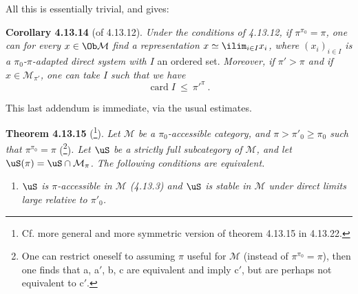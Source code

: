 All this is essentially trivial, and gives:

\noindent\textbf{Corollary 4.13.14} (of 4.13.12). \textit{Under the conditions of 4.13.12, if $\pi^{\pi_0} = \pi$, one can for every $x \in \Ob\mathcal{M}$ find a representation $x \simeq \ilim_{i\in I} x_i$, where $(x_i)_{i\in I}$ is a $\pi_0$-$\pi$-adapted direct system with $I$} an ordered set. \textit{Moreover, if $\pi' > \pi$ and if $x \in \mathcal{M}_{\pi'}$, one can take $I$ such that we have}
\[
\operatorname{card} I \ \leqslant \ {\pi'}^{\pi} \ .
\]

This last addendum is immediate, via the usual estimates.

\noindent\textbf{Theorem 4.13.15} (\footnote[134]{Cf. more general and more symmetric version of theorem 4.13.15 in 4.13.22.}). \textit{Let $\mathcal{M}$ be a $\pi_0$-accessible category, and $\pi > \pi'_0 \geqslant \pi_0$ such that $\pi^{\pi_0} = \pi$} (\footnote[135]{One can restrict oneself to assuming $\pi$ useful for $\mathcal{M}$ (instead of $\pi^{\pi_0} = \pi$), then one finds that a, a$'$, b, c are equivalent and imply c$'$, but are perhaps not equivalent to c$'$.})\textit{. Let $\uS$ be a strictly full subcategory of $\mathcal{M}$, and let $\uS(\pi) = \uS \cap \mathcal{M}_\pi$. The following conditions are equivalent.}
\begin{enumerate}
\item[\circlabel{a}] \textit{$\uS$ is $\pi$-accessible in $\mathcal{M}$ (4.13.3) and $\uS$ is stable in $\mathcal{M}$ under direct limits large relative to $\pi'_0$.}
\end{enumerate}


